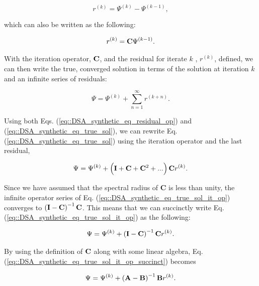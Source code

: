 \begin{equation}
\label{eq::DSA_synthetic_eq_residual}
r^{(k)} = \Psi^{(k)} - \Psi^{(k-1)} ,
\end{equation}

\noindent which can also be written as the following:

\begin{equation}
\label{eq::DSA_synthetic_eq_residual_op}
r^{(k)} = {\bf C}\Psi^{(k-1)} .
\end{equation}

With the iteration operator, ${\bf C}$, and the residual for iterate $k$ , $r^{(k)}$, defined, we can then write the true, converged solution in terms of the solution at iteration $k$ and an infinite series of residuals:

\begin{equation}
\label{eq::DSA_synthetic_eq_true_sol}
\Psi = \Psi^{(k)} + \sum_{n=1}^{\infty} r^{(k+n)} .
\end{equation}

\noindent Using both Eqs. (\ref{eq::DSA_synthetic_eq_residual_op}) and (\ref{eq::DSA_synthetic_eq_true_sol}), we can rewrite Eq. (\ref{eq::DSA_synthetic_eq_true_sol}) using the iteration operator and the last residual,

\begin{equation}
\label{eq::DSA_synthetic_eq_true_sol_it_op}
\Psi = \Psi^{(k)} + \left(  {\bf I} + {\bf C} + {\bf C}^2 + ...  \right) {\bf C} r^{(k)}.
\end{equation}

\noindent Since we have assumed that the spectral radius of {\bf C} is less than unity, the infinite operator series of Eq. (\ref{eq::DSA_synthetic_eq_true_sol_it_op}) converges to $\left(  {\bf I} - {\bf C}   \right)^{-1} {\bf C}$. This means that we can succinctly write Eq. (\ref{eq::DSA_synthetic_eq_true_sol_it_op}) as the following:

\begin{equation}
\label{eq::DSA_synthetic_eq_true_sol_it_op_succinct}
\Psi = \Psi^{(k)} + \left(  {\bf I} - {\bf C}   \right)^{-1} {\bf C} r^{(k)}.
\end{equation}

\noindent By using the definition of ${\bf C}$ along with some linear algebra, Eq. (\ref{eq::DSA_synthetic_eq_true_sol_it_op_succinct}) becomes 

\begin{equation}
\label{eq::DSA_synthetic_eq_true_sol_orig_ops}
\Psi = \Psi^{(k)} + \left(  {\bf A} - {\bf B}   \right)^{-1} {\bf B} r^{(k)}.
\end{equation}

